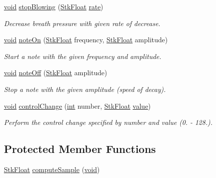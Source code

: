 \begin{DoxyCompactItemize}
\hyperlink{sound_8c_ae35f5844602719cf66324f4de2a658b3}{void} \hyperlink{class_nyq_1_1_clarinet_a217c182438fe5819893fe1a65f21b671}{stop\+Blowing} (\hyperlink{namespace_nyq_a044fa20a706520a617bbbf458a7db7e4}{Stk\+Float} \hyperlink{seqread_8c_ad89d3fac2deab7a9cf6cfc8d15341b85}{rate})
\begin{DoxyCompactList}\small\item\em Decrease breath pressure with given rate of decrease. \end{DoxyCompactList}\item 
\hyperlink{sound_8c_ae35f5844602719cf66324f4de2a658b3}{void} \hyperlink{class_nyq_1_1_clarinet_a8867d4c2ee0a4ff12970e59f4f0fcc6d}{note\+On} (\hyperlink{namespace_nyq_a044fa20a706520a617bbbf458a7db7e4}{Stk\+Float} frequency, \hyperlink{namespace_nyq_a044fa20a706520a617bbbf458a7db7e4}{Stk\+Float} amplitude)
\begin{DoxyCompactList}\small\item\em Start a note with the given frequency and amplitude. \end{DoxyCompactList}\item 
\hyperlink{sound_8c_ae35f5844602719cf66324f4de2a658b3}{void} \hyperlink{class_nyq_1_1_clarinet_ae8a75ce0aca42a5fb2e9871e06e4734b}{note\+Off} (\hyperlink{namespace_nyq_a044fa20a706520a617bbbf458a7db7e4}{Stk\+Float} amplitude)
\begin{DoxyCompactList}\small\item\em Stop a note with the given amplitude (speed of decay). \end{DoxyCompactList}\item 
\hyperlink{sound_8c_ae35f5844602719cf66324f4de2a658b3}{void} \hyperlink{class_nyq_1_1_clarinet_a6bda9d8c495fd79d0a9ce827dcd37a6a}{control\+Change} (\hyperlink{xmltok_8h_a5a0d4a5641ce434f1d23533f2b2e6653}{int} number, \hyperlink{namespace_nyq_a044fa20a706520a617bbbf458a7db7e4}{Stk\+Float} \hyperlink{lib_2expat_8h_a4a30a13b813682e68c5b689b45c65971}{value})
\begin{DoxyCompactList}\small\item\em Perform the control change specified by {\itshape number} and {\itshape value} (0. -\/ 128.). \end{DoxyCompactList}\end{DoxyCompactItemize}
\subsection*{Protected Member Functions}
\begin{DoxyCompactItemize}
\item 
\hyperlink{namespace_nyq_a044fa20a706520a617bbbf458a7db7e4}{Stk\+Float} \hyperlink{class_nyq_1_1_clarinet_a91c5e8fd6c4a0d4ed5f5618cf2339e07}{compute\+Sample} (\hyperlink{sound_8c_ae35f5844602719cf66324f4de2a658b3}{void})
\end{DoxyCompactItemize}
